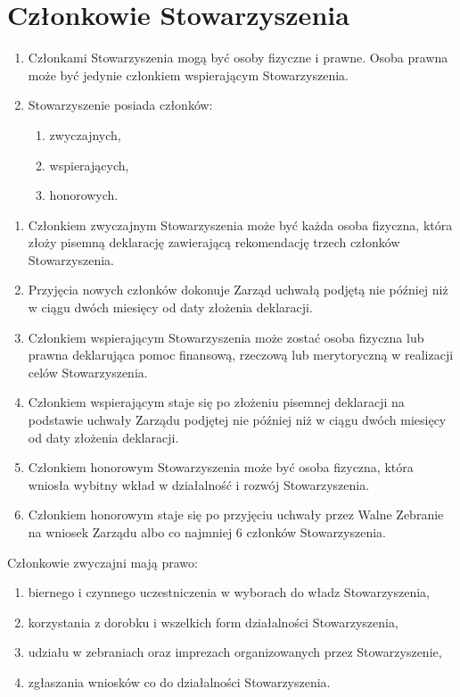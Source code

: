 \documentclass{article}
\begin{document}
\section{Członkowie Stowarzyszenia}
\begin{enumerate}
\item
  Członkami Stowarzyszenia mogą być osoby fizyczne i prawne. Osoba prawna może być jedynie członkiem wspierającym Stowarzyszenia.
\item
  Stowarzyszenie posiada członków:
  \begin{enumerate}
  \def\labelenumii{\alph{enumii}.}
  \item
    zwyczajnych,
  \item
    wspierających,
  \item
    honorowych.
  \end{enumerate}
\end{enumerate}

\begin{enumerate}
\item
  Członkiem zwyczajnym Stowarzyszenia może być każda osoba fizyczna, która złoży pisemną deklarację zawierającą rekomendację trzech członków Stowarzyszenia.
\item
  Przyjęcia nowych członków dokonuje Zarząd uchwałą podjętą nie później niż w ciągu dwóch miesięcy od daty złożenia deklaracji.
\item
  Członkiem wspierającym Stowarzyszenia może zostać osoba fizyczna lub prawna deklarująca pomoc finansową, rzeczową lub merytoryczną w realizacji celów Stowarzyszenia.
\item
  Członkiem wspierającym staje się po złożeniu pisemnej deklaracji na podstawie uchwały Zarządu podjętej nie później niż w ciągu dwóch miesięcy od daty złożenia deklaracji.
\item
  Członkiem honorowym Stowarzyszenia może być osoba fizyczna, która wniosła wybitny wkład w działalność i rozwój Stowarzyszenia.
\item
  Członkiem honorowym staje się po przyjęciu uchwały przez Walne Zebranie na wniosek Zarządu albo co najmniej 6 członków Stowarzyszenia.
\end{enumerate}

Członkowie zwyczajni mają prawo:
\begin{enumerate}
\item
  biernego i czynnego uczestniczenia w wyborach do władz Stowarzyszenia,
\item
  korzystania z dorobku i wszelkich form działalności Stowarzyszenia,
\item
  udziału w zebraniach oraz imprezach organizowanych przez Stowarzyszenie,
\item
  zgłaszania wniosków co do działalności Stowarzyszenia.
\end{enumerate}
\end{document}
